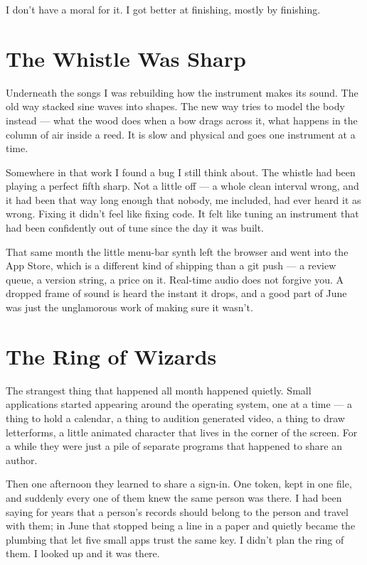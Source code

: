 \documentclass[11pt,letterpaper]{article}
\begin{document}
I don't have a moral for it. I got better at finishing, mostly by finishing.

\section{The Whistle Was Sharp}

Underneath the songs I was rebuilding how the instrument makes its sound. The old way stacked sine waves into shapes. The new way tries to model the body instead --- what the wood does when a bow drags across it, what happens in the column of air inside a reed. It is slow and physical and goes one instrument at a time.

Somewhere in that work I found a bug I still think about. The whistle had been playing a perfect fifth sharp. Not a little off --- a whole clean interval wrong, and it had been that way long enough that nobody, me included, had ever heard it as wrong. Fixing it didn't feel like fixing code. It felt like tuning an instrument that had been confidently out of tune since the day it was built.

That same month the little menu-bar synth left the browser and went into the App Store, which is a different kind of shipping than a git push --- a review queue, a version string, a price on it. Real-time audio does not forgive you. A dropped frame of sound is heard the instant it drops, and a good part of June was just the unglamorous work of making sure it wasn't.

\section{The Ring of Wizards}

The strangest thing that happened all month happened quietly. Small applications started appearing around the operating system, one at a time --- a thing to hold a calendar, a thing to audition generated video, a thing to draw letterforms, a little animated character that lives in the corner of the screen. For a while they were just a pile of separate programs that happened to share an author.

Then one afternoon they learned to share a sign-in. One token, kept in one file, and suddenly every one of them knew the same person was there. I had been saying for years that a person's records should belong to the person and travel with them; in June that stopped being a line in a paper and quietly became the plumbing that let five small apps trust the same key. I didn't plan the ring of them. I looked up and it was there.
\end{document}
